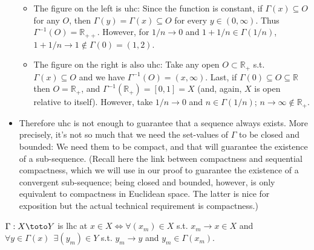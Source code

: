 \documentclass{article}
\begin{document}
\begin{itemize}[label=$\bullet$]
    \begin{itemize}[label=$\circ$]
      \item The figure on the left is uhc: Since the function is constant, if $\Gamma(x) \subseteq O$ for any $O$, then $\Gamma(y) = \Gamma(x) \subseteq O$ for every $y \in (0, \infty)$. Thus $\Gamma^{-1}(O) = \mathbb{R}_{++}$. However, for $1/n \to 0$ and $1 + 1/n \in \Gamma(1/n)$, $1 + 1/n \to 1 \notin \Gamma(0) = (1, 2)$.

      \item The figure on the right is also uhc: Take any open $O \subset \mathbb{R}_+$ s.t. $\Gamma(x) \subseteq O$ and we have $\Gamma^{-1}(O) = (x, \infty)$. Last, if $\Gamma(0) \subseteq O \subseteq \mathbb{R}$ then $O = \mathbb{R}_+$, and $\Gamma^{-1}(\mathbb{R}_+) = [0, 1] = X$  (and, again, $X$ is open relative to itself). However, take $1/n \to 0$ and $n \in \Gamma(1/n)$; $n \to \infty \notin \mathbb{R}_+$.
    \end{itemize}

  \item Therefore uhc is not enough to guarantee that a sequence always exists. More precisely, it's not so much that we need the set-values of $\Gamma$ to be closed and bounded: We need them to be compact, and that will guarantee the existence of a sub-sequence. (Recall here the link between compactness and sequential compactness, which we will use in our proof to guarantee the existence of a convergent sub-sequence; being closed and bounded, however, is only equivalent to compactness in Euclidean space. The latter is nice for exposition but the actual technical requirement is compactness.)
\end{itemize}

\begin{theorem}\label{thm:lecture3_compactness_lhc_sequential}
  $\Gamma: X \toto Y$ is lhc at $x \in X \iff \forall (x_m) \in X$ s.t. $x_m \to x \in X$ and $\forall y \in \Gamma(x) ~~ \exists (y_m) \in Y$ s.t. $y_m \to y$ and $y_m \in \Gamma(x_m)$.
\end{theorem}
\end{document}
